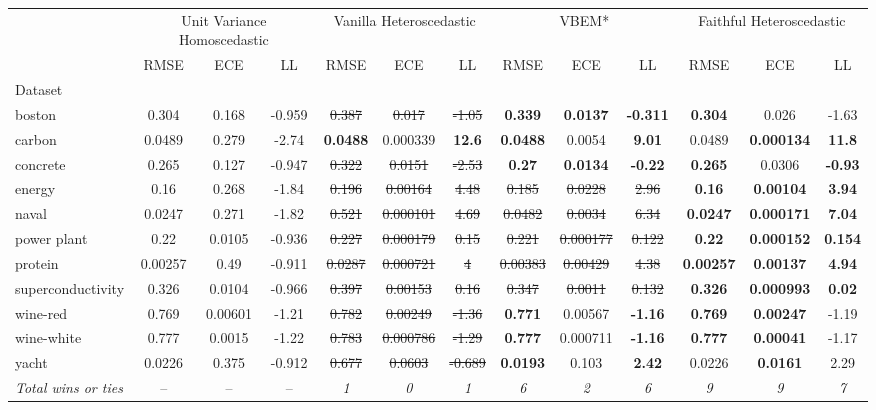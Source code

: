 \begin{tabular}{l|ccc|ccc|ccc|ccc}
\toprule
 & \multicolumn{3}{|c}{Unit Variance Homoscedastic} & \multicolumn{3}{|c}{Vanilla Heteroscedastic} & \multicolumn{3}{|c}{VBEM*} & \multicolumn{3}{|c}{Faithful Heteroscedastic} \\
 & RMSE & ECE & LL & RMSE & ECE & LL & RMSE & ECE & LL & RMSE & ECE & LL \\
Dataset &  &  &  &  &  &  &  &  &  &  &  &  \\
\midrule
boston & 0.304 & 0.168 & -0.959 & \sout{0.387} & \sout{0.017} & \sout{-1.05} & \textbf{0.339} & \textbf{0.0137} & \textbf{-0.311} & \textbf{0.304} & 0.026 & -1.63 \\
carbon & 0.0489 & 0.279 & -2.74 & \textbf{0.0488} & 0.000339 & \textbf{12.6} & \textbf{0.0488} & 0.0054 & \textbf{9.01} & 0.0489 & \textbf{0.000134} & \textbf{11.8} \\
concrete & 0.265 & 0.127 & -0.947 & \sout{0.322} & \sout{0.0151} & \sout{-2.53} & \textbf{0.27} & \textbf{0.0134} & \textbf{-0.22} & \textbf{0.265} & 0.0306 & \textbf{-0.93} \\
energy & 0.16 & 0.268 & -1.84 & \sout{0.196} & \sout{0.00164} & \sout{4.48} & \sout{0.185} & \sout{0.0228} & \sout{2.96} & \textbf{0.16} & \textbf{0.00104} & \textbf{3.94} \\
naval & 0.0247 & 0.271 & -1.82 & \sout{0.521} & \sout{0.000101} & \sout{4.69} & \sout{0.0482} & \sout{0.0034} & \sout{6.34} & \textbf{0.0247} & \textbf{0.000171} & \textbf{7.04} \\
power plant & 0.22 & 0.0105 & -0.936 & \sout{0.227} & \sout{0.000179} & \sout{0.15} & \sout{0.221} & \sout{0.000177} & \sout{0.122} & \textbf{0.22} & \textbf{0.000152} & \textbf{0.154} \\
protein & 0.00257 & 0.49 & -0.911 & \sout{0.0287} & \sout{0.000721} & \sout{4} & \sout{0.00383} & \sout{0.00429} & \sout{4.38} & \textbf{0.00257} & \textbf{0.00137} & \textbf{4.94} \\
superconductivity & 0.326 & 0.0104 & -0.966 & \sout{0.397} & \sout{0.00153} & \sout{0.16} & \sout{0.347} & \sout{0.0011} & \sout{0.132} & \textbf{0.326} & \textbf{0.000993} & \textbf{0.02} \\
wine-red & 0.769 & 0.00601 & -1.21 & \sout{0.782} & \sout{0.00249} & \sout{-1.36} & \textbf{0.771} & 0.00567 & \textbf{-1.16} & \textbf{0.769} & \textbf{0.00247} & -1.19 \\
wine-white & 0.777 & 0.0015 & -1.22 & \sout{0.783} & \sout{0.000786} & \sout{-1.29} & \textbf{0.777} & 0.000711 & \textbf{-1.16} & \textbf{0.777} & \textbf{0.00041} & -1.17 \\
yacht & 0.0226 & 0.375 & -0.912 & \sout{0.677} & \sout{0.0603} & \sout{-0.689} & \textbf{0.0193} & 0.103 & \textbf{2.42} & 0.0226 & \textbf{0.0161} & 2.29 \\
\textit{{Total wins or ties}} & -- & -- & -- & \textit{1} & \textit{0} & \textit{1} & \textit{6} & \textit{2} & \textit{6} & \textit{9} & \textit{9} & \textit{7} \\
\bottomrule
\end{tabular}
